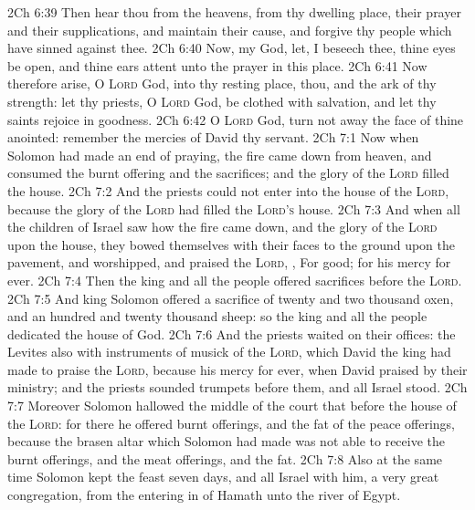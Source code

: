 \vs 2Ch 6:39 Then hear thou from the heavens,  from thy dwelling place, their prayer and their supplications, and maintain their cause, and forgive thy people which have sinned against thee.
\vs 2Ch 6:40 Now, my God, let, I beseech thee, thine eyes be open, and  thine ears  attent unto the prayer  in this place.
\vs 2Ch 6:41 Now therefore arise, O \textsc{Lord} God, into thy resting place, thou, and the ark of thy strength: let thy priests, O \textsc{Lord} God, be clothed with salvation, and let thy saints rejoice in goodness.
\vs 2Ch 6:42 O \textsc{Lord} God, turn not away the face of thine anointed: remember the mercies of David thy servant.
\vs 2Ch 7:1 Now when Solomon had made an end of praying, the fire came down from heaven, and consumed the burnt offering and the sacrifices; and the glory of the \textsc{Lord} filled the house.
\vs 2Ch 7:2 And the priests could not enter into the house of the \textsc{Lord}, because the glory of the \textsc{Lord} had filled the \textsc{Lord's} house.
\vs 2Ch 7:3 And when all the children of Israel saw how the fire came down, and the glory of the \textsc{Lord} upon the house, they bowed themselves with their faces to the ground upon the pavement, and worshipped, and praised the \textsc{Lord}, , For  good; for his mercy  for ever.
\vs 2Ch 7:4 Then the king and all the people offered sacrifices before the \textsc{Lord}.
\vs 2Ch 7:5 And king Solomon offered a sacrifice of twenty and two thousand oxen, and an hundred and twenty thousand sheep: so the king and all the people dedicated the house of God.
\vs 2Ch 7:6 And the priests waited on their offices: the Levites also with instruments of musick of the \textsc{Lord}, which David the king had made to praise the \textsc{Lord}, because his mercy  for ever, when David praised by their ministry; and the priests sounded trumpets before them, and all Israel stood.
\vs 2Ch 7:7 Moreover Solomon hallowed the middle of the court that  before the house of the \textsc{Lord}: for there he offered burnt offerings, and the fat of the peace offerings, because the brasen altar which Solomon had made was not able to receive the burnt offerings, and the meat offerings, and the fat.
\vs 2Ch 7:8 Also at the same time Solomon kept the feast seven days, and all Israel with him, a very great congregation, from the entering in of Hamath unto the river of Egypt.
